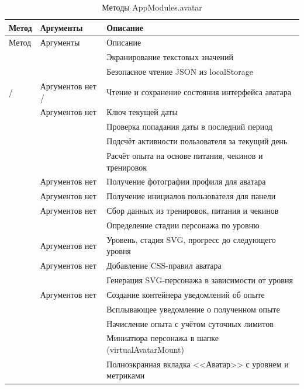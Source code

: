 \begin{xltabular}{\textwidth}{|P{4.4cm}|P{3.4cm}|X|}
	\caption{Методы AppModules.avatar\label{tab:rp-avatar}}\\
	\hline \centrow Метод & \centrow Аргументы & \centrow Описание \\ \hline
	\endfirsthead
	\centrow Метод & \centrow Аргументы & \centrow Описание \\ \hline
	\finishhead
	 &  & Экранирование текстовых значений \\ \hline
	 &  & Безопасное чтение JSON из localStorage \\ \hline
	 /  & Аргументов нет /  & Чтение и сохранение состояния интерфейса аватара \\ \hline
	 & Аргументов нет & Ключ текущей даты \\ \hline
	 &  & Проверка попадания даты в последний период \\ \hline
	 &  & Подсчёт активности пользователя за текущий день \\ \hline
	 &  & Расчёт опыта на основе питания, чекинов и тренировок \\ \hline
	 & Аргументов нет & Получение фотографии профиля для аватара \\ \hline
	 & Аргументов нет & Получение инициалов пользователя для панели \\ \hline
	 & Аргументов нет & Сбор данных из тренировок, питания и чекинов \\ \hline
	 &  & Определение стадии персонажа по уровню \\ \hline
	 & Аргументов нет & Уровень, стадия SVG, прогресс до следующего уровня \\ \hline
	 & Аргументов нет & Добавление CSS-правил аватара \\ \hline
	 &  & Генерация SVG-персонажа в зависимости от уровня \\ \hline
	 & Аргументов нет & Создание контейнера уведомлений об опыте \\ \hline
	 &  & Всплывающее уведомление о полученном опыте \\ \hline
	 &  & Начисление опыта с учётом суточных лимитов \\ \hline
	 &  & Миниатюра персонажа в шапке (virtualAvatarMount) \\ \hline
	 &  & Полноэкранная вкладка <<Аватар>> с уровнем и метриками \\ \hline
\end{xltabular}

